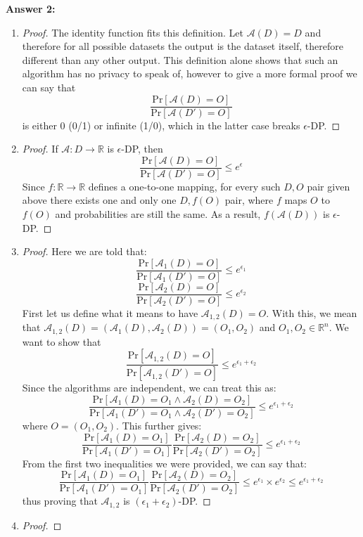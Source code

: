 \documentclass[12pt,reqno]{amsart}
\newcommand{\pr}[0]{\text{Pr}}
\newcommand{\advrs}[0]{\mathcal{A}}
\begin{document}
\newpage
\textbf{Answer 2:} 
\begin{enumerate}[label=(\alph*)]
\item \begin{proof}
The identity function fits this definition. Let $\advrs(D) = D$ and therefore for all possible datasets the output is the dataset itself, therefore different than any other output. This definition alone shows that such an algorithm has no privacy to speak of, however to give a more formal proof we can say that 
$$
\frac{\pr[\advrs(D)=O]}{\pr[\advrs(D')=O]}
$$
is either 0 (0/1) or infinite (1/0), which in the latter case breaks $\epsilon$-DP.
\end{proof}
\item \begin{proof}
If $\advrs : D \to \mathbb{R}$ is $\epsilon$-DP, then
$$
\frac{\pr[\advrs(D)=O]}{\pr[\advrs(D')=O]} \leq e^\epsilon
$$
Since $f : \mathbb{R} \to \mathbb{R}$ defines a one-to-one mapping, for every such $D, O$ pair given above there exists one and only one $D, f(O)$ pair, where $f$ maps $O$ to $f(O)$ and probabilities are still the same. As a result, $f(\advrs(D))$ is $\epsilon$-DP.
\end{proof}
\item \begin{proof}
Here we are told that:
$$
\frac{\pr[\advrs_1(D)=O]}{\pr[\advrs_1(D')=O]} \leq e^{\epsilon_1}
$$
$$
\frac{\pr[\advrs_2(D)=O]}{\pr[\advrs_2(D')=O]} \leq e^{\epsilon_2}
$$
First let us define what it means to have $\advrs_{1,2}(D) = O$. With this, we mean that $\advrs_{1,2}(D) = (\advrs_1(D), \advrs_2(D)) = (O_1, O_2)$ and $O_1, O_2 \in \mathbb{R}^n$. We want to show that
$$
\frac{\pr[\advrs_{1,2}(D)=O]}{\pr[\advrs_{1,2}(D')=O]} \leq e^{\epsilon_1 + \epsilon_2}
$$
Since the algorithms are independent, we can treat this as:
$$
\frac{\pr[\advrs_{1}(D)= O_1 \land \advrs_{2}(D) = O_2]}{\pr[\advrs_{1}(D')=O_1 \land \advrs_{2}(D')=O_2]} \leq e^{\epsilon_1 + \epsilon_2}
$$
where $O = (O_1, O_2)$. This further gives:
$$
\frac{\pr[\advrs_{1}(D)= O_1]}{\pr[\advrs_{1}(D')=O_1]}\frac{\pr[\advrs_{2}(D) = O_2]}{\pr[\advrs_{2}(D')=O_2]} \leq e^{\epsilon_1 + \epsilon_2}
$$
From the first two inequalities we were provided, we can say that:
$$
\frac{\pr[\advrs_{1}(D)= O_1]}{\pr[\advrs_{1}(D')=O_1]}\frac{\pr[\advrs_{2}(D) = O_2]}{\pr[\advrs_{2}(D')=O_2]} \leq e^{\epsilon_1} \times e^{\epsilon_2} \leq e^{\epsilon_1 + \epsilon_2}
$$
thus proving that $\advrs_{1,2}$ is $(\epsilon_1 + \epsilon_2)$-DP.
\end{proof}
\item \begin{proof}

\end{proof}
\end{enumerate}
\end{document}
